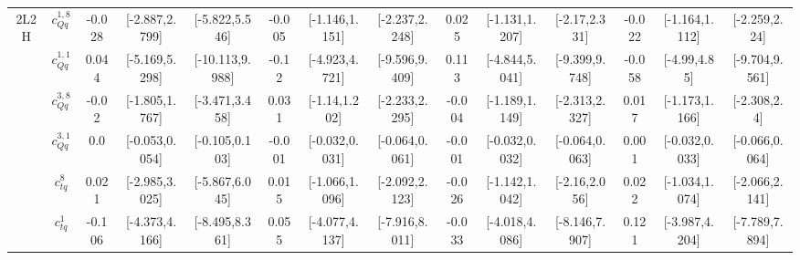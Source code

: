 \documentclass{article}
\begin{document}
\begin{table}[H]
\begin{tabular}{|c|c|c|c|c|c|c|c|c|c|c|c|c|c|}
\hline
\multirow{14}{*}{2L2H}
 & $c_{Qq}^{1,8}$ & -0.028                             & [-2.887,2.799]                                 & [-5.822,5.546] & -0.005                             & [-1.146,1.151]                                 & [-2.237,2.248] & 0.025                             & [-1.131,1.207]                                 & [-2.17,2.331] & -0.022                             & [-1.164,1.112]                                 & [-2.259,2.24] \\ \cline{2-14}
 & $c_{Qq}^{1,1}$ & 0.044                             & [-5.169,5.298]                                 & [-10.113,9.988] & -0.12                             & [-4.923,4.721]                                 & [-9.596,9.409] & 0.113                             & [-4.844,5.041]                                 & [-9.399,9.748] & -0.058                             & [-4.99,4.85]                                 & [-9.704,9.561] \\ \cline{2-14}
 & $c_{Qq}^{3,8}$ & -0.02                             & [-1.805,1.767]                                 & [-3.471,3.458] & 0.031                             & [-1.14,1.202]                                 & [-2.233,2.295] & -0.004                             & [-1.189,1.149]                                 & [-2.313,2.327] & 0.017                             & [-1.173,1.166]                                 & [-2.308,2.4] \\ \cline{2-14}
 & $c_{Qq}^{3,1}$ & 0.0                             & [-0.053,0.054]                                 & [-0.105,0.103] & -0.001                             & [-0.032,0.031]                                 & [-0.064,0.061] & -0.001                             & [-0.032,0.032]                                 & [-0.064,0.063] & 0.001                             & [-0.032,0.033]                                 & [-0.066,0.064] \\ \cline{2-14}
 & $c_{tq}^{8}$ & 0.021                             & [-2.985,3.025]                                 & [-5.867,6.045] & 0.015                             & [-1.066,1.096]                                 & [-2.092,2.123] & -0.026                             & [-1.142,1.042]                                 & [-2.16,2.056] & 0.022                             & [-1.034,1.074]                                 & [-2.066,2.141] \\ \cline{2-14}
 & $c_{tq}^{1}$ & -0.106                             & [-4.373,4.166]                                 & [-8.495,8.361] & 0.055                             & [-4.077,4.137]                                 & [-7.916,8.011] & -0.033                             & [-4.018,4.086]                                 & [-8.146,7.907] & 0.121                             & [-3.987,4.204]                                 & [-7.789,7.894] \\ \cline{2-14}

\end{tabular}
\end{table}
\end{document}
